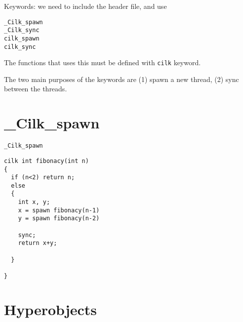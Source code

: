 Keywords: we need to include the header file, and use
\begin{verbatim}
_Cilk_spawn 
_Cilk_sync
cilk_spawn 
cilk_sync
\end{verbatim}
The functions that uses this must be defined with \verb!cilk! keyword.

The two main purposes of the keywords are (1) spawn a new thread, (2) sync
between the threads.

\section{\_Cilk\_spawn}

\verb!_Cilk_spawn!

\begin{verbatim}
cilk int fibonacy(int n)
{
  if (n<2) return n;
  else
  {
    int x, y;
    x = spawn fibonacy(n-1)
    y = spawn fibonacy(n-2)
    
    sync;
    return x+y;
  
  }

}
\end{verbatim}

% 
% 
% 
% 
% 
% 

\section{Hyperobjects}
\label{sec:CilkPlus_hyperobjects}

